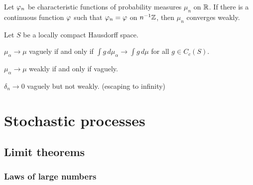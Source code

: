 \documentclass{../../large}
\begin{document}
\begin{prb}
Let $\varphi_n$ be characteristic functions of probability measures $\mu_n$ on $\mathbb{R}$.
If there is a continuous function $\varphi$ such that $\varphi_n=\varphi$ on $n^{-1}\mathbb{Z}$, then $\mu_n$ converges weakly.
\end{prb}


\begin{prb}
\end{prb}


\begin{prb}
Let $S$ be a locally compact Hausdorff space.
\begin{parts}
\item $\mu_\alpha\to\mu$ vaguely if and only if $\int g\,d\mu_\alpha\to\int g\,d\mu$ for all $g\in C_c(S)$.
\item $\mu_\alpha\to\mu$ weakly if and only if vaguely.
\item $\delta_n\to0$ vaguely but not weakly. (escaping to infinity)
\end{parts}
\end{prb}
\begin{pf}
\end{pf}












\part{Stochastic processes}


\chapter{Limit theorems}

\section{Laws of large numbers}
\end{document}
